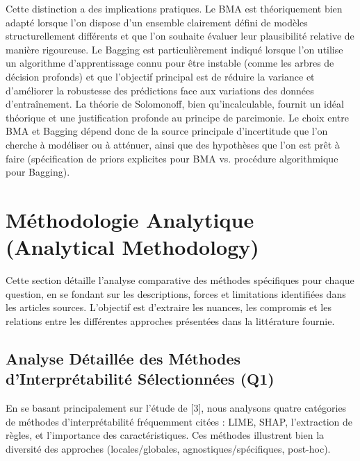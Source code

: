 \documentclass[11pt,a4paper]{article}
\begin{document}
Cette distinction a des implications pratiques. Le BMA est théoriquement bien adapté lorsque l'on dispose d'un ensemble clairement défini de modèles structurellement différents et que l'on souhaite évaluer leur plausibilité relative de manière rigoureuse. Le Bagging est particulièrement indiqué lorsque l'on utilise un algorithme d'apprentissage connu pour être instable (comme les arbres de décision profonds) et que l'objectif principal est de réduire la variance et d'améliorer la robustesse des prédictions face aux variations des données d'entraînement. La théorie de Solomonoff, bien qu'incalculable, fournit un idéal théorique et une justification profonde au principe de parcimonie. Le choix entre BMA et Bagging dépend donc de la source principale d'incertitude que l'on cherche à modéliser ou à atténuer, ainsi que des hypothèses que l'on est prêt à faire (spécification de priors explicites pour BMA vs. procédure algorithmique pour Bagging).

\section{Méthodologie Analytique (Analytical Methodology)}

Cette section détaille l'analyse comparative des méthodes spécifiques pour chaque question, en se fondant sur les descriptions, forces et limitations identifiées dans les articles sources. L'objectif est d'extraire les nuances, les compromis et les relations entre les différentes approches présentées dans la littérature fournie.

\subsection{Analyse Détaillée des Méthodes d'Interprétabilité Sélectionnées (Q1)}

En se basant principalement sur l'étude de \citet{Burkart2021} [3], nous analysons quatre catégories de méthodes d'interprétabilité fréquemment citées : LIME, SHAP, l'extraction de règles, et l'importance des caractéristiques. Ces méthodes illustrent bien la diversité des approches (locales/globales, agnostiques/spécifiques, post-hoc).
\end{document}
